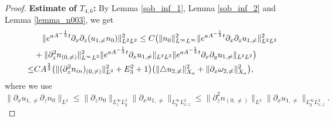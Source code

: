 \documentclass[12pt, reqno]{amsart}
\numberwithin{equation}{section}
\begin{document}
\begin{proof}
		\noindent\textbf{Estimate of $T_{4,6}$:}
		By Lemma \ref{sob_inf_1}, Lemma \ref{sob_inf_2} and Lemma \ref{lemma_n003}, 
		we get 
		\begin{equation}\label{temp1_5}
			\begin{aligned}
				&\quad \|{\rm e}^{aA^{-\frac{1}{3}}t}
				\partial_x\partial_z(u_{1,\neq}n_{0})\|_{L^2L^2}^2
				\leq C\big(\|n_0\|^2_{L^{\infty} L^{\infty}}\|{\rm 	e}^{aA^{-\frac{1}{3}}t}
				\partial_x\partial_zu_{1,\neq}\|_{L^2L^2}^2\\
				&+\|\partial_z^2n_{(0,\neq)}\|^2_{L^{\infty} L^{2}}
				\|{\rm e}^{aA^{-\frac{1}{3}}t}
				\partial_xu_{1,\neq}\|_{L^2L^2}
				\|{\rm e}^{aA^{-\frac{1}{3}}t}
				\partial_x\partial_yu_{1,\neq}\|_{L^2L^2}\big)\\
				\leq&CA^{\frac23}
				\big(\|(\partial_z^2n_{\rm in})_{(0,\neq)}\|_{L^2}^2
				+E_3^2+1\big)
				\big(\|\triangle u_{2,\neq}\|^2_{X_a}
				+\|\partial_x\omega_{2,\neq}\|^2_{X_a}\big),
			\end{aligned}
		\end{equation}
		where we use 	
		$\|\partial_xu_{1,\neq}\partial_zn_{0}\|_{L^2}\leq 
		\|\partial_zn_{0}\|_{L^{\infty}_zL^2_y}
		\|\partial_xu_{1,\neq}\|_{L^{\infty}_yL^2_{x,z}}
		\leq\|\partial_z^2n_{(0,\neq)}\|_{L^2}
		\|\partial_xu_{1,\neq}\|_{L^{\infty}_yL^2_{x,z}}.$
		

\end{proof}
\end{document}
